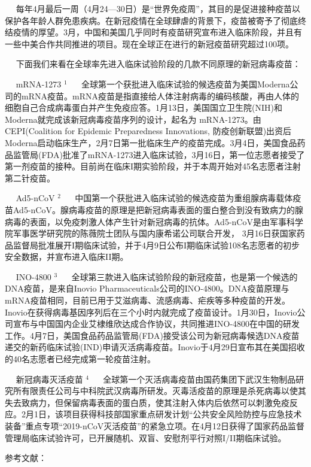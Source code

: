 \documentclass[]{article}
\begin{document}
\(\quad\)
每年4月最后一周（4月24---30日）是``世界免疫周''，其目的是促进接种疫苗以保护各年龄人群免患疾病。在新冠疫情在全球肆虐的背景下，疫苗被寄予了彻底终结疫情的厚望。3月，中国和美国几乎同时有疫苗研究宣布进入临床阶段，并且有一些中美合作共同推进的项目。现在全球正在进行的新冠疫苗研究超过100项。

\(\quad\)
下面我们来看在全球率先进入临床试验阶段的几款不同原理的新冠病毒疫苗：

\(\quad\) mRNA-1273 \(^1\) \(\quad\)
全球第一个获批进入临床试验的候选疫苗为美国Moderna公司的mRNA疫苗。mRNA疫苗是指直接给人体注射病毒的编码核酸，再由人体的细胞自己合成病毒蛋白并产生免疫应答。1月13日，美国国立卫生院(NIH)和Moderna就完成该新冠病毒疫苗序列的设计，起名为
mRNA-1273。由CEPI(Coalition for Epidemic Preparedness Innovations,
防疫创新联盟)出资后Moderna启动临床生产，2月7日第一批临床生产的疫苗完成。3月4日，美国食品药品监管局(FDA)批准了mRNA-1273进入临床试验，3月16日，第一位志愿者接受了第一剂疫苗的接种。目前尚在临床I期实验阶段，并于本周开始对45名志愿者注射第二针疫苗。

\(\quad\) Ad5-nCoV \(^2\) \(\quad\)
中国第一个获批进入临床试验的候选疫苗为重组腺病毒载体疫苗Ad5-nCoV。腺病毒疫苗的原理是把新冠病毒表面的蛋白整合到没有致病力的腺病毒的表面，以免疫刺激人体产生针对新冠病毒的抗体。Ad5-nCoV是由军事科学院军事医学研究院的陈薇院士团队与国内康希诺公司联合开发，
3月16日获国家药品监督局批准展开I期临床试验，并于4月9日公布I期临床试验108名志愿者的初步安全数据，并宣布进入临床II期。

\(\quad\) INO-4800 \(^3\) \(\quad\)
全球第三款进入临床试验阶段的新冠疫苗，也是第一个候选的DNA疫苗，是来自Inovio
Pharmaceuticals公司的INO-4800。DNA疫苗原理与mRNA疫苗相同，目前已用于艾滋病毒、流感病毒、疟疾等多种疫苗的开发。Inovio在获得病毒基因序列后在三个小时内就完成了疫苗设计。1月30日，Inovio公司宣布与中国国内企业艾棣维欣达成合作协议，共同推进INO-4800在中国的研发工作。4月7日，美国食品药品监管局(FDA)接受该公司为新冠病毒候选DNA疫苗递交的新药临床试验(IND)申请灭活病毒疫苗。Inovio于4月29日宣布其在美国招收的40名志愿者已经完成第一轮疫苗注射。

\(\quad\) 新冠病毒灭活疫苗 \(^4\) \(\quad\)
全球第一个灭活病毒疫苗由国药集团下武汉生物制品研究所有限责任公司与中科院武汉病毒所研发。灭毒活疫苗的原理是杀死病毒以使其失去致病力，但保留病毒表面的蛋白质，使其注射入体内后依然可以刺激免疫反应。2月1日，该项目获得科技部国家重点研发计划``公共安全风险防控与应急技术装备''重点专项``2019-nCoV灭活疫苗''的紧急立项。在4月12日获得了国家药品监督管理局临床试验许可，已开展随机、双盲、安慰剂平行对照I/II期临床试验。

\Large 参考文献：
\end{document}
